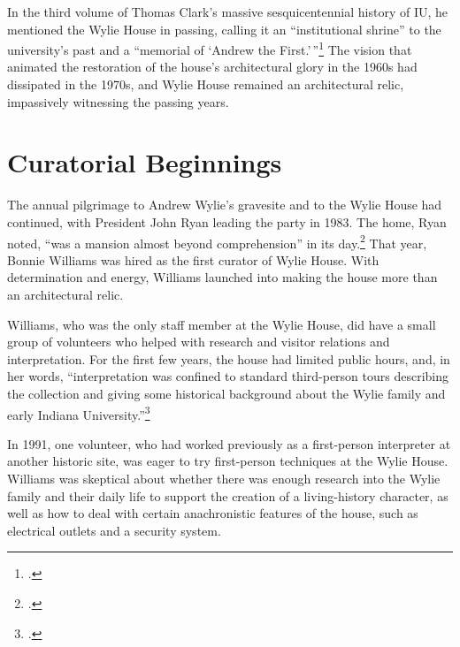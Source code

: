 \documentclass[
  american,
  letterpaper,
]{scrreprt}
\begin{document}
In the third volume of Thomas Clark's massive sesquicentennial history
of IU, he mentioned the Wylie House in passing, calling it an
``institutional shrine'' to the university's past and a ``memorial of
`Andrew the First.'\,''\footnote{.} The vision that animated
the restoration of the house's architectural glory in the 1960s had
dissipated in the 1970s, and Wylie House remained an architectural
relic, impassively witnessing the passing years.

\section{Curatorial Beginnings}\label{curatorial-beginnings}

The annual pilgrimage to Andrew Wylie's gravesite and to the Wylie House
had continued, with President John Ryan leading the party in 1983. The
home, Ryan noted, ``was a mansion almost beyond comprehension'' in its
day.\footnote{.}
That year, Bonnie Williams was hired as the first curator of Wylie
House. With determination and energy, Williams launched into making the
house more than an architectural relic.

Williams, who was the only staff member at the Wylie House, did have a
small group of volunteers who helped with research and visitor relations
and interpretation. For the first few years, the house had limited
public hours, and, in her words, ``interpretation was confined to
standard third-person tours describing the collection and giving some
historical background about the Wylie family and early Indiana
University.''\footnote{.}

In 1991, one volunteer, who had worked previously as a first-person
interpreter at another historic site, was eager to try first-person
techniques at the Wylie House. Williams was skeptical about whether
there was enough research into the Wylie family and their daily life to
support the creation of a living-history character, as well as how to
deal with certain anachronistic features of the house, such as
electrical outlets and a security system.
\end{document}

